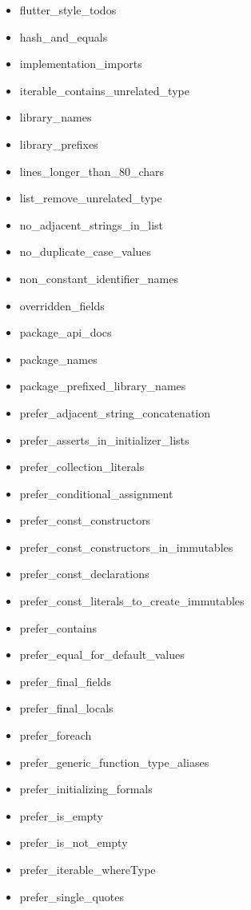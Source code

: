 \begin{itemize}
    \item flutter\_style\_todos
    \item hash\_and\_equals
    \item implementation\_imports
    \item iterable\_contains\_unrelated\_type
    \item library\_names
    \item library\_prefixes
    \item lines\_longer\_than\_80\_chars     
    \item list\_remove\_unrelated\_type
    \item no\_adjacent\_strings\_in\_list
    \item no\_duplicate\_case\_values
    \item non\_constant\_identifier\_names
    \item overridden\_fields
    \item package\_api\_docs
    \item package\_names
    \item package\_prefixed\_library\_names
    \item prefer\_adjacent\_string\_concatenation
    \item prefer\_asserts\_in\_initializer\_lists
    \item prefer\_collection\_literals
    \item prefer\_conditional\_assignment
    \item prefer\_const\_constructors
    \item prefer\_const\_constructors\_in\_immutables
    \item prefer\_const\_declarations
    \item prefer\_const\_literals\_to\_create\_immutables
    \item prefer\_contains
    \item prefer\_equal\_for\_default\_values
    \item prefer\_final\_fields
    \item prefer\_final\_locals
    \item prefer\_foreach
    \item prefer\_generic\_function\_type\_aliases
    \item prefer\_initializing\_formals
    \item prefer\_is\_empty
    \item prefer\_is\_not\_empty
    \item prefer\_iterable\_whereType
    \item prefer\_single\_quotes

\end{itemize}
